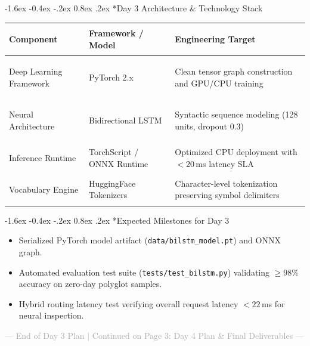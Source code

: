 \documentclass[11pt,a4paper]{article}
\makeatletter
\renewcommand{\section}{\@startsection{section}{1}{\z@}%
  {-1.6ex \@plus -0.4ex \@minus -.2ex}%
  {0.8ex \@plus .2ex}%
  {\normalfont\large\bfseries\color{primaryblue}}}
\makeatother
\begin{document}
\section*{Day 3 Architecture \& Technology Stack}
\begin{table}[htbp]
\centering
\footnotesize
\begin{tabularx}{\textwidth}{>{\bfseries\raggedright\arraybackslash}p{3.0cm} >{\raggedright\arraybackslash}p{3.8cm} >{\raggedright\arraybackslash}X}
\toprule
\textbf{Component} & \textbf{Framework / Model} & \textbf{Engineering Target} \\
\midrule
Deep Learning Framework & PyTorch 2.x & Clean tensor graph construction and GPU/CPU training \\
Neural Architecture & Bidirectional LSTM & Syntactic sequence modeling (128 units, dropout 0.3) \\
Inference Runtime & TorchScript / ONNX Runtime & Optimized CPU deployment with $< 20$\,ms latency SLA \\
Vocabulary Engine & HuggingFace Tokenizers & Character-level tokenization preserving symbol delimiters \\
\bottomrule
\end{tabularx}
\end{table}

\section*{Expected Milestones for Day 3}
\begin{itemize}[leftmargin=1.5em, itemsep=2pt]
    \item Serialized PyTorch model artifact (\texttt{data/bilstm\_model.pt}) and ONNX graph.
    \item Automated evaluation test suite (\texttt{tests/test_bilstm.py}) validating $\ge 98\%$ accuracy on zero-day polyglot samples.
    \item Hybrid routing latency test verifying overall request latency $< 22$\,ms for neural inspection.
\end{itemize}

\vfill
\begin{center}
\footnotesize \textcolor{darkgray}{--- End of Day 3 Plan $\vert$ Continued on Page 3: Day 4 Plan & Final Deliverables ---}
\end{center}

\newpage
\end{document}
